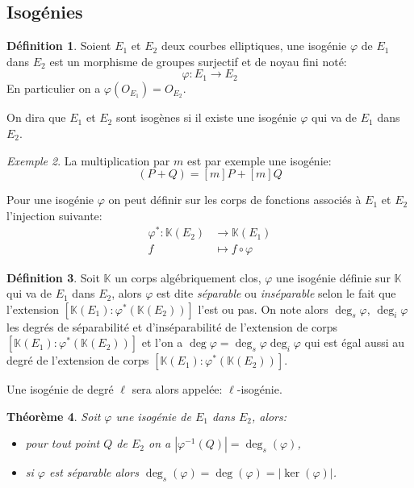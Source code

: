 \documentclass[10pt,a4paper]{book}
\theoremstyle{plain}
\newtheorem{thm}{Théorème}
\theoremstyle{definition}
\theoremstyle{definition}
\theoremstyle{definition}
\theoremstyle{definition}
\newtheorem{defi}[thm]{Définition}
\theoremstyle{remark}
\theoremstyle{remark}
\newtheorem{exe}[thm]{Exemple}
\begin{document}
\subsection{Isogénies}

\begin{defi}
Soient $E_1$ et $E_2$ deux courbes elliptiques, une isogénie $\varphi$ de $E_1$ dans $E_2$ est un morphisme de groupes surjectif et de noyau fini noté:
\begin{equation*}
\varphi:E_1 \rightarrow E_2
\end{equation*}
En particulier on a $\varphi(O_{E_1})=O_{E_2}$.
\end{defi}
On dira que $E_1$ et $E_2$ sont isogènes si il existe une isogénie $\varphi$ qui va de $E_1$ dans $E_2$. 

\begin{exe}
La multiplication par $m$ est par exemple une isogénie:
\begin{equation*}
[m](P+Q)=[m]P+[m]Q
\end{equation*}
\end{exe}

Pour une isogénie $\varphi$ on peut définir sur les corps de fonctions associés à $E_1$ et $E_2$ l'injection suivante:
\begin{equation*}
\begin{alignedat}{1}
\varphi^*: \mathbb{K}(E_2) & \rightarrow \mathbb{K}(E_1) \\
f & \mapsto f  \circ \varphi
\end{alignedat}
\end{equation*}

\begin{defi}
Soit $\mathbb{K}$ un corps algébriquement clos, $\varphi$ une isogénie définie sur $\mathbb{K}$ qui va de $E_1$ dans $E_2$, alors $\varphi$ est dite \emph{séparable} ou \emph{inséparable} selon le fait que l'extension $[\mathbb{K}(E_1):\varphi^*(\mathbb{K}(E_2))]$ l'est ou pas. On note alors \emph{$\deg_s{\varphi}$}, \emph{$\deg_i{\varphi}$} les degrés de séparabilité et d'inséparabilité de l'extension de corps $[\mathbb{K}(E_1):\varphi^*(\mathbb{K}(E_2))]$ et l'on a $\deg{\varphi}=\deg_s{\varphi}\deg_i{\varphi}$ qui est égal aussi au degré de l'extension de corps $[\mathbb{K}(E_1):\varphi^*(\mathbb{K}(E_2))]$.
\end{defi}


Une isogénie de degré $\ell$ sera alors appelée: $\ell$-isogénie.

\begin{thm}
Soit $\varphi$ une isogénie de $E_1$ dans $E_2$, alors:
\begin{itemize}
\item pour tout point $Q$ de $E_2$ on a $|\varphi^{-1}(Q)|=\deg_s(\varphi)$,
\item si $\varphi$ est séparable alors $\deg_s(\varphi)=\deg(\varphi)=|\ker(\varphi)|$.
\end{itemize}
\end{thm}
\end{document}
